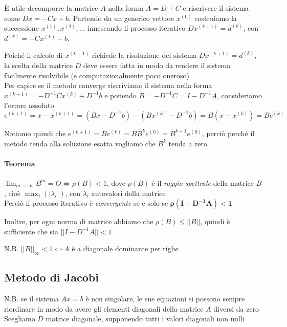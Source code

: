 \documentclass[openany]{book}
\begin{document}
È utile decomporre la matrice $A$ nella forma $A=D+C$ e riscrivere il sistema come $Dx=-Cx+b$. Partendo da un generico vettore $x^{(0)}$ costruiamo la successione $x^{(1)},x^{(2)},...$ innescando il processo iterativo $Dx^{(k+1)}=d^{(k)}$, con $d^{(k)}= -Cx^{(k)}+b$.

Poiché il calcolo di $x^{(k+1)}$ richiede la risoluzione del sistema $Dx^{(k+1)}=d^{(k)}$, la scelta della matrice $D$ deve essere fatta in modo da rendere il sistema facilmente risolvibile (e computazionalmente poco oneroso)
\\

Per capire se il metodo converge riscriviamo il sistema nella forma $x^{(k+1)}=-D^{-1}Cx^{(k)}+D^{-1}b$ e ponendo $B=-D^{-1}C=I-D^{-1}A$, consideriamo l'errore assoluto $e^{(k+1)}=x-x^{(k+1)}=(Bx-D^{-1}b)-(Bx^{(k)}-D^{-1}b)=B(x-x^{(k)})=Be^{(k)}$

Notiamo quindi che $e^{(k+1)}= Be^{(k)}=BB^{k}e^{(0)}=B^{k+1}e^{(0)}$, perciò perché il metodo tenda alla soluzione esatta vogliamo che $B^k$ tenda a zero

\paragraph{Teorema}

$\lim_{m\to\infty}B^m=O \Leftrightarrow \rho(B)<1$, dove $\rho(B)$ è il \textit{raggio spettrale} della matrice $B$, cioè $\max_i (|\lambda_i|)$, con $\lambda_i$ autovalori della matrice
\\

Perciò il processo iterativo è \textit{convergente} se e solo se $\boldsymbol{\rho(I-D^{-1}A)<1}$

Inoltre, per ogni norma di matrice abbiamo che $\rho(B)\leq||B||$, quindi è sufficiente che sia $||I-D^{-1}A||<1$

N.B. $||B||_\infty<1 \Leftrightarrow A$ è a diagonale dominante per righe
\subsection{Metodo di Jacobi}

N.B. se il sistema $Ax=b$ è non singolare, le sue equazioni si possono sempre riordinare in modo da avere gli elementi diagonali della matrice $A$ diversi da zero
\\

Scegliamo $D$ matrice diagonale, supponendo tutti i valori diagonali non nulli
\\
\end{document}
